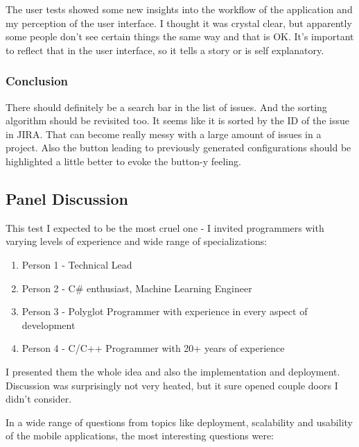 The user tests showed some new insights into the workflow of the application and my perception of the user interface. I thought it was crystal clear, but apparently some people don't see certain things the same way and that is OK. It's important to reflect that in the user interface, so it tells a story or is self explanatory.

\subsubsection*{Conclusion}

There should definitely be a search bar in the list of issues. And the sorting algorithm should be revisited too. It seems like it is sorted by the ID of the issue in JIRA. That can become really messy with a large amount of issues in a project. Also the button leading to previously generated configurations should be highlighted a little better to evoke the button-y feeling.

\subsection{Panel Discussion}

This test I expected to be the most cruel one - I invited programmers with varying levels of experience and wide range of specializations:

\begin{enumerate}
	\item Person 1 - Technical Lead
	\item Person 2 - C\# enthusiast, Machine Learning Engineer
	\item Person 3 - Polyglot Programmer with experience in every aspect of development
	\item Person 4 - C/C++ Programmer with 20+ years of experience
\end{enumerate}

I presented them the whole idea and also the implementation and deployment. Discussion was surprisingly not very heated, but it sure opened couple doors I didn't consider. 

\newpage

In a wide range of questions from topics like deployment, scalability and usability of the mobile applications, the most interesting questions were:

